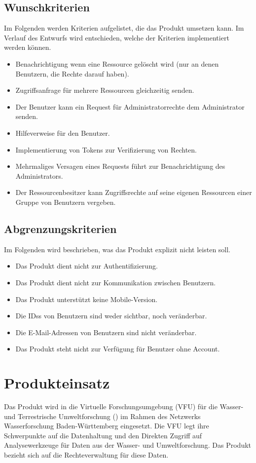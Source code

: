 \documentclass[parskip=full,11pt]{scrartcl}
\begin{document}
\subsection{Wunschkriterien}
Im Folgenden werden Kriterien aufgelistet, die das Produkt umsetzen kann.
Im Verlauf des Entwurfs wird entschieden, welche der Kriterien  implementiert werden können.
\begin{itemize}[itemsep=0pt]
\item Benachrichtigung wenn eine Ressource gelöscht wird (nur an denen Benutzern, die Rechte darauf haben).
\item Zugriffsanfrage für mehrere Ressourcen gleichzeitig senden.
\item Der Benutzer kann ein Request für Administratorrechte dem Administrator senden.
\item Hilfeverweise für den Benutzer.
\item Implementierung von \glspl{Token} zur Verifizierung von Rechten.
\item Mehrmaliges Versagen eines Requests führt zur Benachrichtigung des Administrators.
\item Der Ressourcenbesitzer kann Zugriffsrechte auf seine eigenen Ressourcen einer Gruppe von Benutzern vergeben.
\end{itemize}

\subsection{Abgrenzungskriterien}
Im Folgenden wird beschrieben, was das Produkt explizit nicht leisten soll.
\begin{itemize}[itemsep=0pt]
\item Das Produkt dient nicht zur Authentifizierung.
\item Das Produkt dient nicht zur Kommunikation zwischen Benutzern.
\item Das Produkt unterstützt keine Mobile-Version.
\item Die \glspl{IDs} von Benutzern sind weder sichtbar, noch veränderbar.
\item Die E-Mail-Adressen von Benutzern sind nicht veränderbar.
\item Das Produkt steht nicht zur Verfügung für Benutzer ohne Account.
\end{itemize}


\section{Produkteinsatz}
Das Produkt wird in die Virtuelle Forschungsumgebung (VFU) für die Wasser-
und Terrestrische Umweltforschung (\grqq) im Rahmen des Netzwerks
Wasserforschung Baden-Württemberg eingesetzt. Die VFU legt ihre Schwerpunkte
auf die Datenhaltung und den Direkten Zugriff auf Analysewerkzeuge für Daten
aus der Wasser- und Umweltforschung. Das Produkt bezieht sich auf die
Rechteverwaltung für diese Daten.
\end{document}
